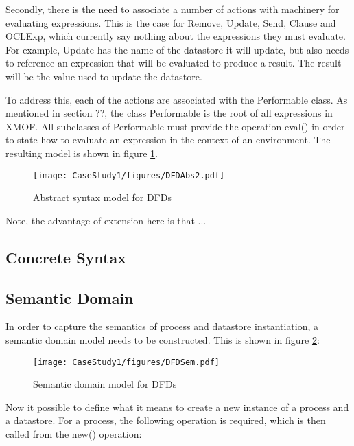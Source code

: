 Secondly, there is the need to associate a number of actions with
machinery for evaluating expressions. This is the case for Remove,
Update, Send, Clause and OCLExp, which currently say nothing about
the expressions they must evaluate. For example, Update has the
name of the datastore it will update, but also needs to reference
an expression that will be evaluated to produce a result. The
result will be the value used to update the datastore.

To address this, each of the actions are associated with the
Performable class. As mentioned in section ??, the class
Performable is the root of all expressions in XMOF. All subclasses
of Performable must provide the operation eval() in order to state
how to evaluate an expression in the context of an environment. The
resulting model is shown in figure \ref{dfdabs2}.

\begin{figure}[htb]
\begin{center}
\texttt{[image: CaseStudy1/figures/DFDAbs2.pdf]}
\caption{Abstract syntax model for DFDs} \label{dfdabs2}
\end{center}
\end{figure}

Note, the advantage of extension here is that ...

\subsection{Concrete Syntax}

\subsection{Semantic Domain}

In order to capture the semantics of process and datastore
instantiation, a semantic domain model needs to be constructed.
This is shown in figure \ref{dfdsem}:

\begin{figure}[htb]
\begin{center}
\texttt{[image: CaseStudy1/figures/DFDSem.pdf]}
\caption{Semantic domain model for DFDs} \label{dfdsem}
\end{center}
\end{figure}

Now it possible to define what it means to create a new instance of
a process and a datastore. For a process, the following operation
is required, which is then called from the new() operation:


